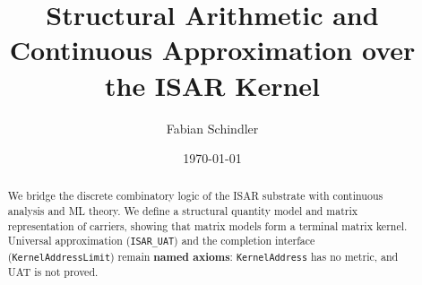 \documentclass{report}
\title{Structural Arithmetic and Continuous Approximation over the ISAR Kernel}
\author{Fabian Schindler}
\date{\today}
\begin{document}
\maketitle

\begin{abstract}
We bridge the discrete combinatory logic of the ISAR substrate with continuous analysis and ML theory. We define a structural quantity model and matrix representation of carriers, showing that matrix models form a terminal matrix kernel. Universal approximation (\texttt{ISAR\_UAT}) and the completion interface (\texttt{KernelAddressLimit}) remain \textbf{named axioms}: \texttt{KernelAddress} has no metric, and UAT is not proved.
\end{abstract}


\end{document}
